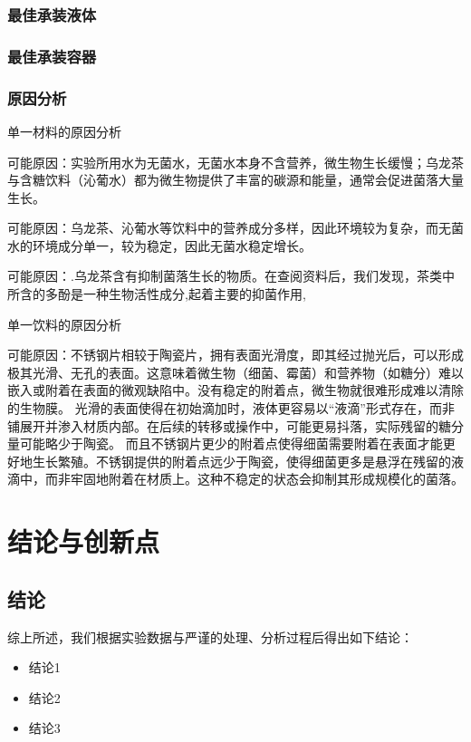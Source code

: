 \documentclass[12pt,a4paper]{article}
\begin{document}
\subsubsection{最佳承装液体}

\subsubsection{最佳承装容器}

\subsubsection{原因分析}
单一材料的原因分析

可能原因：实验所用水为无菌水，无菌水本身不含营养，微生物生长缓慢；乌龙茶与含糖饮料（沁葡水）都为微生物提供了丰富的碳源和能量，通常会促进菌落大量生长。

可能原因：乌龙茶、沁葡水等饮料中的营养成分多样，因此环境较为复杂，而无菌水的环境成分单一，较为稳定，因此无菌水稳定增长。

可能原因：.乌龙茶含有抑制菌落生长的物质。在查阅资料后，我们发现，茶类中所含的多酚是一种生物活性成分,起着主要的抑菌作用, \cite{HXSJ202002001}

单一饮料的原因分析

可能原因：不锈钢片相较于陶瓷片，拥有表面光滑度，即其经过抛光后，可以形成极其光滑、无孔的表面。这意味着微生物（细菌、霉菌）和营养物（如糖分）难以嵌入或附着在表面的微观缺陷中。没有稳定的附着点，微生物就很难形成难以清除的生物膜。
光滑的表面使得在初始滴加时，液体更容易以“液滴”形式存在，而非铺展开并渗入材质内部。在后续的转移或操作中，可能更易抖落，实际残留的糖分量可能略少于陶瓷。
而且不锈钢片更少的附着点使得细菌需要附着在表面才能更好地生长繁殖。不锈钢提供的附着点远少于陶瓷，使得细菌更多是悬浮在残留的液滴中，而非牢固地附着在材质上。这种不稳定的状态会抑制其形成规模化的菌落。



\section{结论与创新点}
\subsection{结论}
综上所述，我们根据实验数据与严谨的处理、分析过程后得出如下结论：
\begin{itemize}
    \item 结论1
    \item 结论2
    \item 结论3
\end{itemize}
\end{document}

